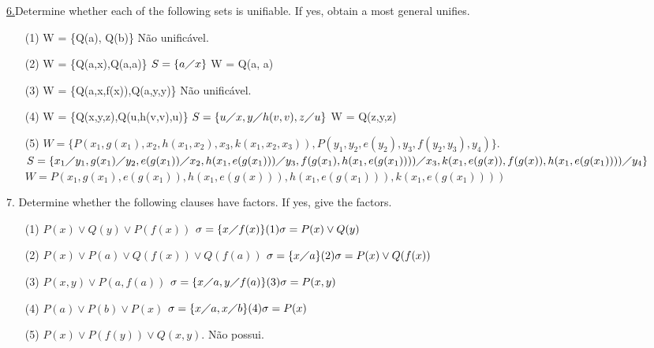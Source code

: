\underline{6.}Determine whether each of the following sets is unifiable. If yes, obtain a most general unifies.
\begin{itemize}
 \item[(1)] W = \{Q(a), Q(b)\} \newline
Não unificável.
 \item[(2)] W = \{Q(a,x),Q(a,a)\} \newline
$ S = \{ a \diagup x \} $ \newline
W = Q(a, a)
 \item[(3)] W = \{Q(a,x,f(x)),Q(a,y,y)\} \newline
Não unificável.
 \item[(4)] W = \{Q(x,y,z),Q(u,h(v,v),u)\} \newline
$ S = \{u \diagup x, y \diagup h(v,v), z \diagup u \} $ \newline
W = Q(z,y,z)
 \item[(5)] $ W = \{P(x_1,g(x_1),x_2,h(x_1,x_2),x_3,k(x_1,x_2,x_3)), P(y_1,y_2,e(y_2),y_3,f(y_2,y_3),y_4)\} $. \newline
$ S = \{ x_1 \diagup y_1, g(x_1) \diagup y_2, e(g(x_1)) \diagup x_2, h(x_1, e(g(x_1))) \diagup y_3, f(g(x_1), h(x_1,e(g(x_1)))) \diagup x_3,\newline k(x_1, e(g(x)), f(g(x)), h(x_1,e(g(x_1)))) \diagup y_4 \} $\newline
$ W = P(x_1, g(x_1), e(g(x_1)), h(x_1, e(g(x))), h(x_1,e(g(x_1))) , k(x_1,e(g(x_1))))$
\end{itemize}

7. Determine whether the following clauses have factors. If yes, give the factors.
\begin{itemize}
 \item[(1)] $ P(x) \vee Q(y) \vee P(f(x)) $ \newline
$ \sigma = \{x \diagup f(x) \} \\
(1)\sigma = P(x) \vee Q(y) $
 \item[(2)] $ P(x) \vee P(a) \vee Q(f(x)) \vee Q(f(a)) $ \newline
$ \sigma = \{x \diagup a \} \\
(2)\sigma = P(x) \vee Q(f(x)) $
 \item[(3)] $ P(x, y) \vee P(a, f(a)) $ \newline
$ \sigma = \{ x \diagup a, y \diagup f(a) \} \\
(3)\sigma = P(x, y) $
 \item[(4)] $ P(a) \vee P(b) \vee P(x) $ \newline
$ \sigma = \{x \diagup a, x \diagup b \} \\
(4)\sigma = P(x)$
 \item[(5)] $ P(x) \vee P(f(y)) \vee Q(x,y) $. \newline
Não possui.
\end{itemize}

